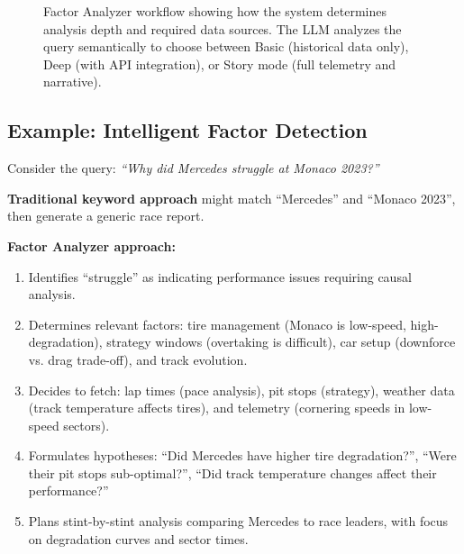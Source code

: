 \documentclass[11pt]{article}
\begin{document}
\begin{figure}[ht]
    \caption{Factor Analyzer workflow showing how the system determines analysis depth and required data sources. The LLM analyzes the query semantically to choose between Basic (historical data only), Deep (with API integration), or Story mode (full telemetry and narrative).}
    \label{fig:factor-flow}
\end{figure}

\subsection{Example: Intelligent Factor Detection}

Consider the query: \textit{``Why did Mercedes struggle at Monaco 2023?''}

\textbf{Traditional keyword approach} might match ``Mercedes'' and ``Monaco 2023'', then generate a generic race report.

\textbf{Factor Analyzer approach:}
\begin{enumerate}[leftmargin=1.5em]
    \item Identifies ``struggle'' as indicating performance issues requiring causal analysis.
    \item Determines relevant factors: tire management (Monaco is low-speed, high-degradation), strategy windows (overtaking is difficult), car setup (downforce vs. drag trade-off), and track evolution.
    \item Decides to fetch: lap times (pace analysis), pit stops (strategy), weather data (track temperature affects tires), and telemetry (cornering speeds in low-speed sectors).
    \item Formulates hypotheses: ``Did Mercedes have higher tire degradation?'', ``Were their pit stops sub-optimal?'', ``Did track temperature changes affect their performance?''
    \item Plans stint-by-stint analysis comparing Mercedes to race leaders, with focus on degradation curves and sector times.
\end{enumerate}
\end{document}
